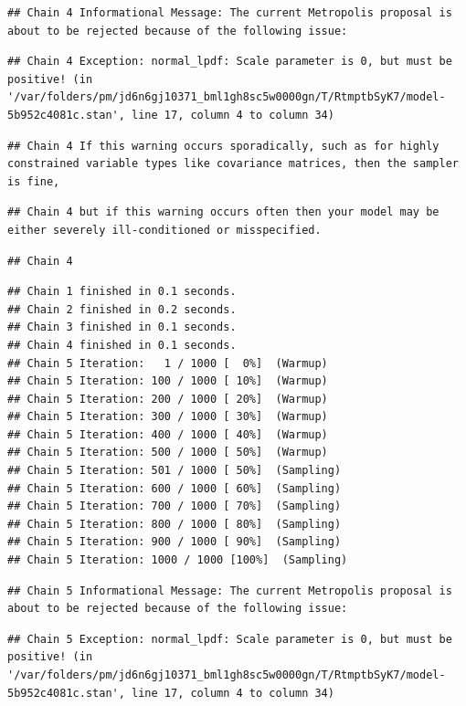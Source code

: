 \documentclass[
]{book}
\begin{document}
\begin{verbatim}
## Chain 4 Informational Message: The current Metropolis proposal is about to be rejected because of the following issue:
\end{verbatim}

\begin{verbatim}
## Chain 4 Exception: normal_lpdf: Scale parameter is 0, but must be positive! (in '/var/folders/pm/jd6n6gj10371_bml1gh8sc5w0000gn/T/RtmptbSyK7/model-5b952c4081c.stan', line 17, column 4 to column 34)
\end{verbatim}

\begin{verbatim}
## Chain 4 If this warning occurs sporadically, such as for highly constrained variable types like covariance matrices, then the sampler is fine,
\end{verbatim}

\begin{verbatim}
## Chain 4 but if this warning occurs often then your model may be either severely ill-conditioned or misspecified.
\end{verbatim}

\begin{verbatim}
## Chain 4
\end{verbatim}

\begin{verbatim}
## Chain 1 finished in 0.1 seconds.
## Chain 2 finished in 0.2 seconds.
## Chain 3 finished in 0.1 seconds.
## Chain 4 finished in 0.1 seconds.
## Chain 5 Iteration:   1 / 1000 [  0%]  (Warmup) 
## Chain 5 Iteration: 100 / 1000 [ 10%]  (Warmup) 
## Chain 5 Iteration: 200 / 1000 [ 20%]  (Warmup) 
## Chain 5 Iteration: 300 / 1000 [ 30%]  (Warmup) 
## Chain 5 Iteration: 400 / 1000 [ 40%]  (Warmup) 
## Chain 5 Iteration: 500 / 1000 [ 50%]  (Warmup) 
## Chain 5 Iteration: 501 / 1000 [ 50%]  (Sampling) 
## Chain 5 Iteration: 600 / 1000 [ 60%]  (Sampling) 
## Chain 5 Iteration: 700 / 1000 [ 70%]  (Sampling) 
## Chain 5 Iteration: 800 / 1000 [ 80%]  (Sampling) 
## Chain 5 Iteration: 900 / 1000 [ 90%]  (Sampling) 
## Chain 5 Iteration: 1000 / 1000 [100%]  (Sampling)
\end{verbatim}

\begin{verbatim}
## Chain 5 Informational Message: The current Metropolis proposal is about to be rejected because of the following issue:
\end{verbatim}

\begin{verbatim}
## Chain 5 Exception: normal_lpdf: Scale parameter is 0, but must be positive! (in '/var/folders/pm/jd6n6gj10371_bml1gh8sc5w0000gn/T/RtmptbSyK7/model-5b952c4081c.stan', line 17, column 4 to column 34)
\end{verbatim}
\end{document}
